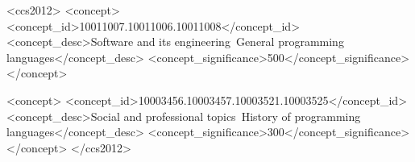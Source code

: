 \begin{CCSXML}
<ccs2012> <concept> <concept_id>10011007.10011006.10011008</concept_id>
<concept_desc>Software and its engineering~General programming languages</concept_desc>
<concept_significance>500</concept_significance> </concept>

<concept>
<concept_id>10003456.10003457.10003521.10003525</concept_id>
<concept_desc>Social and professional topics~History of programming
languages</concept_desc>
<concept_significance>300</concept_significance> </concept>
</ccs2012>
\end{CCSXML}

 


